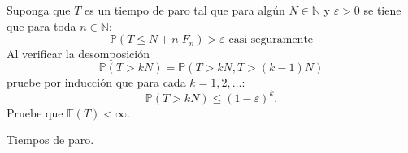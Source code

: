 \begin{problema}
		Suponga que \(T\) es un tiempo de paro tal que para algún 
		\(N\in\mathbb{N}\) y \(\varepsilon>0\) se tiene que para toda \(n\in\mathbb{N}\):
		\begin{equation}\label{problema1_2:hipotesis_del_problema}
		\mathbb{P} (T \leq N + n | F_n) > \varepsilon \text{ casi seguramente}
		\end{equation}
		Al verificar la desomposici\'on
		\begin{equation}\label{problema1_2:sugerencia_del_problema}
			\mathbb{P} (T>kN)= \mathbb{P} (T>kN,T>(k-1)N)
		\end{equation}
		pruebe por inducci\'on que para cada \(k=1,2,\ldots\):
		$$ \mathbb{P} (T>kN)\leq (1-\varepsilon)^k.  $$
		Pruebe que \( \mathbb{E}(T)<\infty \). 
	\begin{categoria} Tiempos de paro.\end{categoria}
\end{problema}

